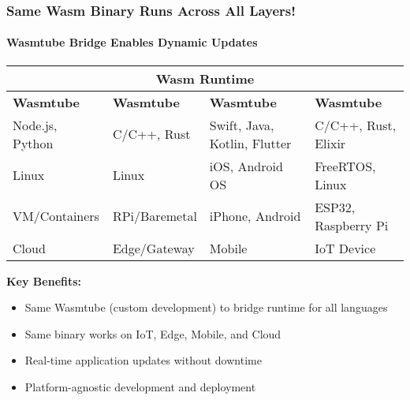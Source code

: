 \documentclass{beamer}
\begin{document}
\begin{frame}
    \frametitle{Same Wasm Binary Runs Across All Layers!}
    \framesubtitle{Wasmtube Bridge Enables Dynamic Updates}
    
    \begin{center}
    \small
    \begin{tabular}{|p{2.5cm}|p{2.5cm}|p{2.5cm}|p{2.5cm}|}
    \hline
    \multicolumn{4}{|c|}{\textbf{Wasm Runtime}} \\
    \hline
    \rowcolor{gray!30}
    \textbf{Wasmtube} & \textbf{Wasmtube} & \textbf{Wasmtube} & \textbf{Wasmtube} \\
    \hline
    Node.js, Python & C/C++, Rust & Swift, Java, Kotlin, Flutter & C/C++, Rust, Elixir \\
    \hline
    Linux & Linux & iOS, Android OS & FreeRTOS, Linux \\
    \hline
    VM/Containers & RPi/Baremetal & iPhone, Android & ESP32, Raspberry Pi \\
    \hline
    Cloud & Edge/Gateway & Mobile & IoT Device \\
    \hline
    \end{tabular}
    \end{center}
    
    \textbf{Key Benefits:}
    \begin{itemize}
    \item Same Wasmtube (custom development) to bridge runtime for all languages
    \item Same binary works on IoT, Edge, Mobile, and Cloud
    \item Real-time application updates without downtime
    \item Platform-agnostic development and deployment
    \end{itemize}
    \end{frame}
\end{document}

